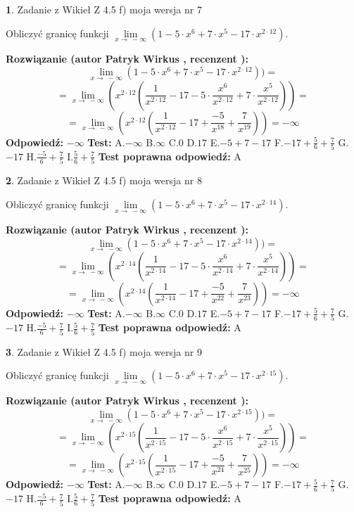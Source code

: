 \documentclass[12pt, a4paper]{article}
\theoremstyle{definition} %
\newtheorem{zad}{}
\newcommand{\zadStart}[1]{\begin{zad}#1\newline}
\newcommand{\zadStop}{\end{zad}}
\newcommand{\rozwStart}[2]{\noindent \textbf{Rozwiązanie (autor #1 , recenzent #2): }\newline}
\newcommand{\rozwStop}{\newline}
\newcommand{\odpStart}{\noindent \textbf{Odpowiedź:}\newline}
\newcommand{\odpStop}{\newline}
\newcommand{\testStart}{\noindent \textbf{Test:}\newline}
\newcommand{\testStop}{\newline}
\newcommand{\kluczStart}{\noindent \textbf{Test poprawna odpowiedź:}\newline}
\newcommand{\kluczStop}{\newline}
\begin{document}
\zadStart{Zadanie z Wikieł Z 4.5 f) moja wersja nr 7}



Obliczyć granicę funkcji  $\lim\limits_{x\to\ -\infty}(1 - 5 \cdot x^{6}+7 \cdot x^{5}- 17 \cdot x^{2\cdot12})$.
\zadStop
\rozwStart{Patryk Wirkus}{}
$$\lim\limits_{x\to\ -\infty}(1 - 5 \cdot x^{6}+7 \cdot x^{5}- 17 \cdot x^{2\cdot12}))=$$
$$=\lim\limits_{x\to\ -\infty}(x^{2\cdot12}(\frac{1}{x^{2\cdot12}}-17 -5 \cdot \frac{x^{6}}{x^{2\cdot12}}+7 \cdot \frac{x^{5}}{x^{2\cdot12}}))=$$
$$=\lim\limits_{x\to\ -\infty}(x^{2\cdot12}(\frac{1}{x^{2\cdot12}}-17 + \frac{-5}{x^{18}}+ \frac{7}{x^{19}}))=-\infty$$
\rozwStop
\odpStart
$-\infty$
\odpStop
\testStart
A.$-\infty$ B.$\infty$ C.$0$ D.$17$ E.$-5 + 7 - 17$
F.$-17+\frac{5}{6}+\frac{7}{5}$ G.$-17$
H.$\frac{-5}{6}+\frac{7}{5}$
I.$\frac{5}{6}+\frac{7}{5}$
\testStop
\kluczStart
A
\kluczStop



\zadStart{Zadanie z Wikieł Z 4.5 f) moja wersja nr 8}



Obliczyć granicę funkcji  $\lim\limits_{x\to\ -\infty}(1 - 5 \cdot x^{6}+7 \cdot x^{5}- 17 \cdot x^{2\cdot14})$.
\zadStop
\rozwStart{Patryk Wirkus}{}
$$\lim\limits_{x\to\ -\infty}(1 - 5 \cdot x^{6}+7 \cdot x^{5}- 17 \cdot x^{2\cdot14}))=$$
$$=\lim\limits_{x\to\ -\infty}(x^{2\cdot14}(\frac{1}{x^{2\cdot14}}-17 -5 \cdot \frac{x^{6}}{x^{2\cdot14}}+7 \cdot \frac{x^{5}}{x^{2\cdot14}}))=$$
$$=\lim\limits_{x\to\ -\infty}(x^{2\cdot14}(\frac{1}{x^{2\cdot14}}-17 + \frac{-5}{x^{22}}+ \frac{7}{x^{23}}))=-\infty$$
\rozwStop
\odpStart
$-\infty$
\odpStop
\testStart
A.$-\infty$ B.$\infty$ C.$0$ D.$17$ E.$-5 + 7 - 17$
F.$-17+\frac{5}{6}+\frac{7}{5}$ G.$-17$
H.$\frac{-5}{6}+\frac{7}{5}$
I.$\frac{5}{6}+\frac{7}{5}$
\testStop
\kluczStart
A
\kluczStop



\zadStart{Zadanie z Wikieł Z 4.5 f) moja wersja nr 9}



Obliczyć granicę funkcji  $\lim\limits_{x\to\ -\infty}(1 - 5 \cdot x^{6}+7 \cdot x^{5}- 17 \cdot x^{2\cdot15})$.
\zadStop
\rozwStart{Patryk Wirkus}{}
$$\lim\limits_{x\to\ -\infty}(1 - 5 \cdot x^{6}+7 \cdot x^{5}- 17 \cdot x^{2\cdot15}))=$$
$$=\lim\limits_{x\to\ -\infty}(x^{2\cdot15}(\frac{1}{x^{2\cdot15}}-17 -5 \cdot \frac{x^{6}}{x^{2\cdot15}}+7 \cdot \frac{x^{5}}{x^{2\cdot15}}))=$$
$$=\lim\limits_{x\to\ -\infty}(x^{2\cdot15}(\frac{1}{x^{2\cdot15}}-17 + \frac{-5}{x^{24}}+ \frac{7}{x^{25}}))=-\infty$$
\rozwStop
\odpStart
$-\infty$
\odpStop
\testStart
A.$-\infty$ B.$\infty$ C.$0$ D.$17$ E.$-5 + 7 - 17$
F.$-17+\frac{5}{6}+\frac{7}{5}$ G.$-17$
H.$\frac{-5}{6}+\frac{7}{5}$
I.$\frac{5}{6}+\frac{7}{5}$
\testStop
\kluczStart
A
\kluczStop
\end{document}
